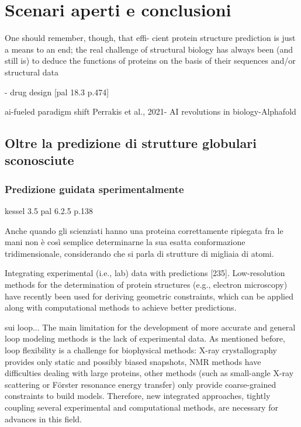 \chapter{Scenari aperti e conclusioni}

One should remember, though, that effi-
cient protein structure prediction is just a means to an end; the real challenge of structural
biology has always been (and still is) to deduce the functions of proteins on the basis of their
sequences and/or structural data\supercite{kessel}


- drug design [pal 18.3 p.474]


ai-fueled paradigm shift
Perrakis et al., 2021- AI revolutions in biology-Alphafold


\section{Oltre la predizione di strutture globulari sconosciute}

\subsection{Predizione guidata sperimentalmente}
kessel 3.5
pal 6.2.5 p.138

Anche quando gli scienziati hanno una proteina correttamente ripiegata fra le mani non è così semplice determinarne la sua esatta conformazione tridimensionale, considerando che si parla di strutture di migliaia di atomi.

Integrating experimental (i.e., lab) data with predictions [235]. Low-resolution
methods for the determination of protein structures (e.g., electron microscopy) have
recently been used for deriving geometric constraints, which can be applied along
with computational methods to achieve better predictions.


sui loop...\supercite{barozet2021current}
The main limitation for the development of more accurate and general loop modeling methods is the lack of experimental data. As mentioned before, loop flexibility is a challenge for biophysical methods: X-ray crystallography provides only static and possibly biased snapshots, NMR methods have difficulties dealing with large proteins, other methods (such as small-angle X-ray scattering or Förster resonance energy transfer) only provide coarse-grained constraints to build models. Therefore, new integrated approaches, tightly coupling several experimental and computational methods, are necessary for advances in this field.


